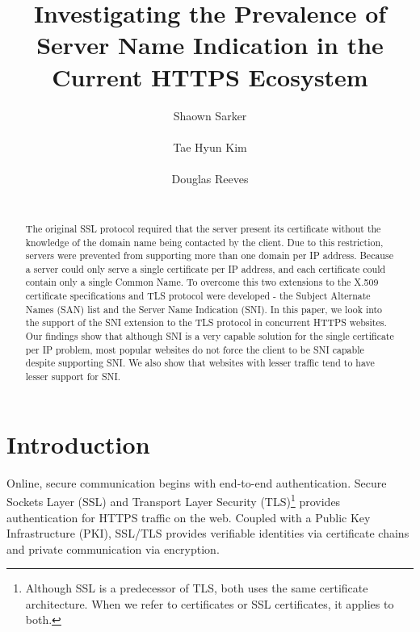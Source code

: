\documentclass{acm_proc_article-sp}
\begin{document}
\title{Investigating the Prevalence of Server Name Indication in the Current HTTPS Ecosystem}

\author{
\alignauthor
Shaown Sarker\\
       \\
\alignauthor
Tae Hyun Kim\\
       \\
\alignauthor
Douglas Reeves\\
       \\
}

\date{}

\maketitle

\begin{abstract}

The original SSL protocol required that the server present its certificate without the knowledge of the domain name being contacted by the client. Due to this restriction, servers were prevented from supporting more than one domain per IP address. Because a server could only serve a single certificate per IP address, and each certificate could contain only a single Common Name. To overcome this two extensions to the X.509 certificate specifications and TLS protocol were developed - the Subject Alternate Names (SAN) list and the Server Name Indication (SNI). In this paper, we look into the support of the SNI extension to the TLS protocol in concurrent HTTPS websites. Our findings show that although SNI is a very capable solution for the single certificate per IP problem, most popular websites do not force the client to be SNI capable despite supporting SNI. We also show that websites with lesser traffic tend to have lesser support for SNI.

\end{abstract}

\section{Introduction}

Online, secure communication begins with end-to-end authentication. Secure Sockets Layer (SSL) and Transport Layer Security (TLS)\footnote{Although SSL is a predecessor of TLS, both uses the same certificate architecture. When we refer to certificates or SSL certificates, it applies to both.} provides authentication for HTTPS traffic on the web. Coupled with a Public Key Infrastructure (PKI), SSL/TLS provides verifiable identities via certificate chains and private communication via encryption. 
\end{document}
